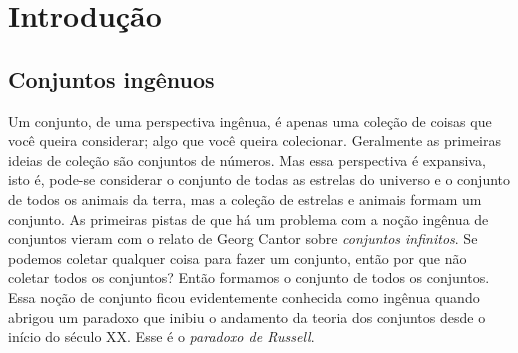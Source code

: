 \section{Introdução}
   \subsection{Conjuntos ingênuos}
      Um conjunto, de uma perspectiva ingênua, é apenas uma coleção 
      de coisas que você queira considerar; algo que você queira 
      colecionar. Geralmente as primeiras ideias de coleção são 
      conjuntos de números. Mas essa perspectiva é expansiva, 
      isto é, pode-se considerar o conjunto de todas as estrelas 
      do universo e o conjunto de todos os animais da terra, 
      mas a coleção de estrelas e animais formam um conjunto.\newline
      As primeiras pistas de que há um problema com a noção ingênua de 
      conjuntos vieram com o relato de Georg Cantor sobre 
      \emph{conjuntos infinitos}. Se podemos coletar qualquer coisa 
      para fazer um conjunto, então por que não coletar todos os 
      conjuntos? Então formamos o conjunto de todos os conjuntos.\newline
      Essa noção de conjunto ficou evidentemente conhecida como ingênua 
      quando abrigou um paradoxo que inibiu o andamento da teoria dos 
      conjuntos desde o início do século XX. Esse é o \emph{paradoxo de 
      Russell}. 

